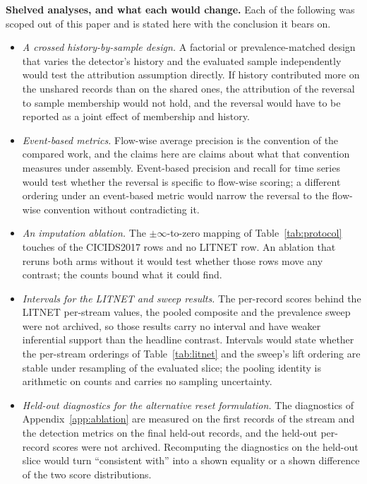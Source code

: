 \documentclass[manuscript,anonymous,review]{acmart}
\begin{document}
\textbf{Shelved analyses, and what each would change.} Each of the following
was scoped out of this paper and is stated here with the conclusion it bears
on.
\begin{itemize}
\item \emph{A crossed history-by-sample design.} A factorial or
prevalence-matched design that varies the detector's history and the evaluated
sample independently would test the attribution assumption directly. If
history contributed more on the unshared records than on the shared ones, the
attribution of the reversal to sample membership would not hold, and the
reversal would have to be reported as a joint effect of membership and
history.
\item \emph{Event-based metrics.} Flow-wise average precision is the
convention of the compared work, and the claims here are claims about what
that convention measures under assembly. Event-based precision and recall for
time series~\citep{tatbul2018precision} would test whether the reversal is
specific to flow-wise scoring; a different ordering under an event-based
metric would narrow the reversal to the flow-wise convention without
contradicting it.
\item \emph{An imputation ablation.} The $\pm\infty$-to-zero mapping of
Table~\ref{tab:protocol} touches \RefImputeCicidsAffectedRows{} of the
\RefImputeCicidsRows{} CICIDS2017 rows and no LITNET row. An ablation that
reruns both arms without it would test whether those rows move any contrast;
the counts bound what it could find.
\item \emph{Intervals for the LITNET and sweep results.} The per-record
scores behind the LITNET per-stream values, the pooled composite and the
prevalence sweep were not archived, so those results carry no interval and
have weaker inferential support than the headline contrast. Intervals would
state whether the per-stream orderings of Table~\ref{tab:litnet} and the
sweep's lift ordering are stable under resampling of the evaluated slice; the
pooling identity is arithmetic on counts and carries no sampling
uncertainty.
\item \emph{Held-out diagnostics for the alternative reset formulation.}
The diagnostics of Appendix~\ref{app:ablation} are measured on the first
\SSixDiagWindowRows{} records of the stream and the detection metrics on the
final \SSixTestRows{} held-out records, and the held-out per-record scores were
not archived. Recomputing the diagnostics on the held-out slice would turn
``consistent with'' into a shown equality or a shown difference of the two
score distributions.
\end{itemize}
\end{document}
